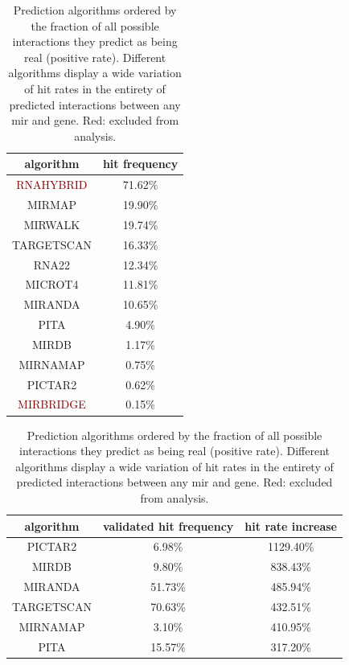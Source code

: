 \begin{table}
\sffamily
\small
\noindent\parbox[t]{.35\linewidth}{
\centering
\begin{tabular}{c | c}
algorithm & hit frequency\\ \hline
\hline
\textcolor{Maroon}{RNAHYBRID} & 71.62\%\\ \hline
\textcolor{OliveGreen}{MIRMAP} & 19.90\%\\ \hline
\textcolor{OliveGreen}{MIRWALK} & 19.74\%\\ \hline
\textcolor{OliveGreen}{TARGETSCAN} & 16.33\%\\ \hline
\textcolor{OliveGreen}{RNA22} & 12.34\%\\ \hline
\textcolor{OliveGreen}{MICROT4} & 11.81\%\\ \hline
\textcolor{OliveGreen}{MIRANDA} & 10.65\%\\ \hline
\textcolor{OliveGreen}{PITA} & 4.90\%\\ \hline
\textcolor{OliveGreen}{MIRDB} & 1.17\%\\ \hline
\textcolor{OliveGreen}{MIRNAMAP} & 0.75\%\\ \hline
\textcolor{OliveGreen}{PICTAR2} & 0.62\%\\ \hline
\textcolor{Maroon}{MIRBRIDGE} & 0.15\%\\ \hline
\end{tabular}
\caption{Prediction algorithms ordered by the fraction of all possible interactions they predict as being real (positive rate). Different algorithms display a wide variation of hit rates in the entirety of predicted interactions between any \ac{mir} and gene. Red: excluded from analysis.}
\label{tab:alg.hit.freq.all}
}
\hfill
\noindent\parbox[t]{.6\linewidth}{
\begin{tabular}{c | c | c}
algorithm & validated hit frequency & hit rate increase\\ \hline
\hline
\textcolor{OliveGreen}{PICTAR2} & 6.98\% & 1129.40\%\\ \hline
\textcolor{OliveGreen}{MIRDB} & 9.80\% & 838.43\%\\ \hline
\textcolor{OliveGreen}{MIRANDA} & 51.73\% & 485.94\%\\ \hline
\textcolor{OliveGreen}{TARGETSCAN} & 70.63\% & 432.51\%\\ \hline
\textcolor{OliveGreen}{MIRNAMAP} & 3.10\% & 410.95\%\\ \hline
\textcolor{OliveGreen}{PITA} & 15.57\% & 317.20\%\\ \hline

\end{tabular}}
\end{table}
